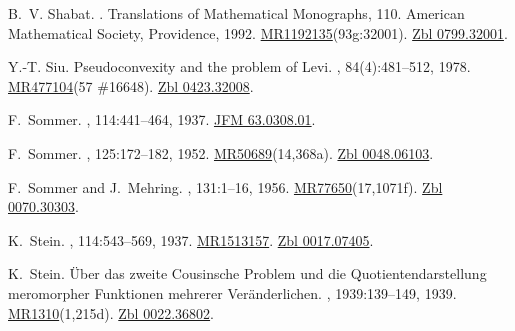 \documentclass[11pt,a4paper, final, twoside]{article}
\numberwithin{equation}{section}
\begin{document}
\begin{appendices}
\begin{thebibliography}{100}
B.~V. Shabat.
.
\newblock Translations of Mathematical Monographs, 110. American Mathematical
  Society, Providence, 1992.
\newblock
  \href{http://www.ams.org/mathscinet-getitem?mr=1192135}{MR1192135}(93g:32001).
  \href{http://zbmath.org/?q=an:0799.32001}{Zbl 0799.32001}.

Y.-T. Siu.
\newblock Pseudoconvexity and the problem of {L}evi.
, 84(4):481--512,
  1978.
\newblock \href{http://www.ams.org/mathscinet-getitem?mr=477104}{MR477104}(57
  \#16648). \href{http://zbmath.org/?q=an:0423.32008}{Zbl 0423.32008}.

F.~Sommer.
, 114:441--464, 1937.
\newblock \href{http://zbmath.org/?q=an:63.0308.01}{JFM 63.0308.01}.

F.~Sommer.
, 125:172--182, 1952.
\newblock
  \href{http://www.ams.org/mathscinet-getitem?mr=50689}{MR50689}(14,368a).
  \href{http://zbmath.org/?q=an:0048.06103}{Zbl 0048.06103}.

F.~Sommer and J.~Mehring.
, 131:1--16, 1956.
\newblock
  \href{http://www.ams.org/mathscinet-getitem?mr=77650}{MR77650}(17,1071f).
  \href{http://zbmath.org/?q=an:0070.30303}{Zbl 0070.30303}.

K.~Stein.
, 114:543--569, 1937.
\newblock \href{http://www.ams.org/mathscinet-getitem?mr=1513157}{MR1513157}.
  \href{http://zbmath.org/?q=an:0017.07405}{Zbl 0017.07405}.

K.~Stein.
\newblock \"{U}ber das zweite {C}ousinsche {P}roblem und die
  {Q}uotientendarstellung meromorpher {F}unktionen mehrerer {V}er\"anderlichen.
,
  1939:139--149, 1939.
\newblock \href{http://www.ams.org/mathscinet-getitem?mr=1310}{MR1310}(1,215d).
  \href{http://zbmath.org/?q=an:0022.36802}{Zbl 0022.36802}.


\end{thebibliography}
\end{appendices}
\end{document}
